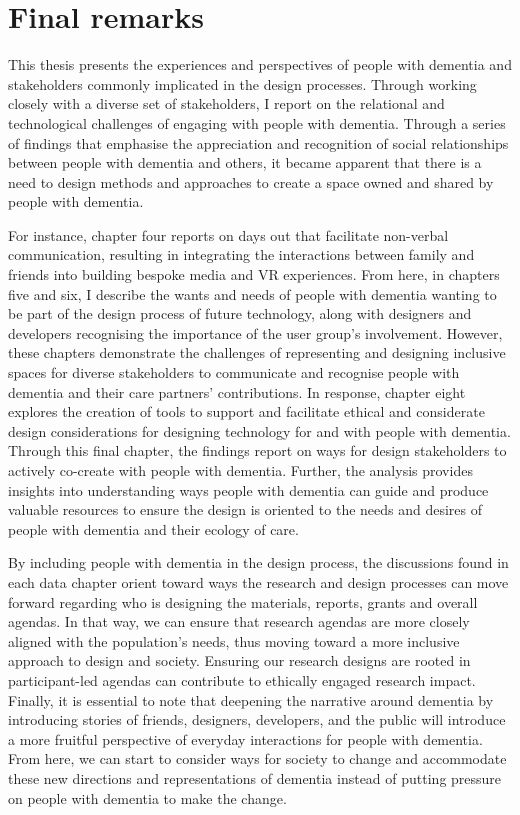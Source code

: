 \section{Final remarks}
\label{Discussion:FinalRemarks}
This thesis presents the experiences and perspectives of people with dementia and stakeholders commonly implicated in the design processes. Through working closely with a diverse set of stakeholders, I report on the relational and technological challenges of engaging with people with dementia. Through a series of findings that emphasise the appreciation and recognition of social relationships between people with dementia and others, it became apparent that there is a need to design methods and approaches to create a space owned and shared by people with dementia.

For instance, chapter four reports on days out that facilitate non-verbal communication, resulting in integrating the interactions between family and friends into building bespoke media and VR experiences. From here, in chapters five and six, I describe the wants and needs of people with dementia wanting to be part of the design process of future technology, along with designers and developers recognising the importance of the user group's involvement. However, these chapters demonstrate the challenges of representing and designing inclusive spaces for diverse stakeholders to communicate and recognise people with dementia and their care partners' contributions. In response, chapter eight explores the creation of tools to support and facilitate ethical and considerate design considerations for designing technology for and with people with dementia. Through this final chapter, the findings report on ways for design stakeholders to actively co-create with people with dementia. Further, the analysis provides insights into understanding ways people with dementia can guide and produce valuable resources to ensure the design is oriented to the needs and desires of people with dementia and their ecology of care.

By including people with dementia in the design process, the discussions found in each data chapter orient toward ways the research and design processes can move forward regarding who is designing the materials, reports, grants and overall agendas. In that way, we can ensure that research agendas are more closely aligned with the population's needs, thus moving toward a more inclusive approach to design and society. Ensuring our research designs are rooted in participant-led agendas can contribute to ethically engaged research impact. Finally, it is essential to note that deepening the narrative around dementia by introducing stories of friends, designers, developers, and the public will introduce a more fruitful perspective of everyday interactions for people with dementia. From here, we can start to consider ways for society to change and accommodate these new directions and representations of dementia instead of putting pressure on people with dementia to make the change.



